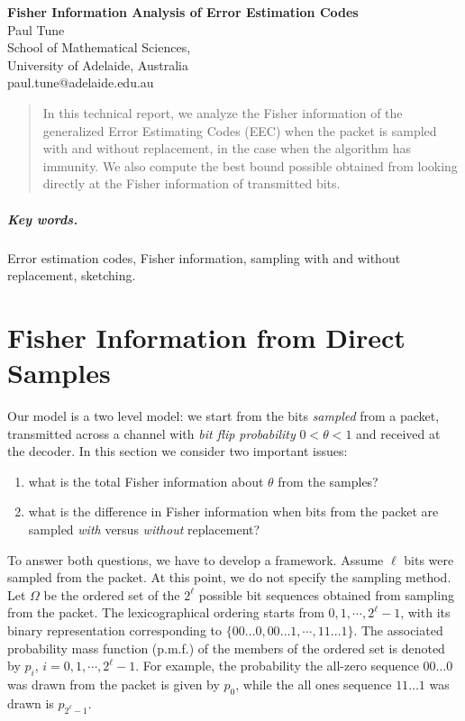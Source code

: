 \documentclass[12pt]{article}
\numberwithin{equation}{section}
\numberwithin{table}{section}
\numberwithin{figure}{section}
\begin{document}

\begin{center}
\textbf{\Large Fisher Information Analysis of Error Estimation Codes} \\[6pt]
  Paul Tune \\[6pt]
  School of Mathematical Sciences,\\
  University of Adelaide, Australia  \\[6pt]
  paul.tune@adelaide.edu.au
\end{center}

\begin{abstract}
In this technical report, we analyze the Fisher information of the generalized Error Estimating Codes (EEC) when the packet is sampled with 
and without replacement, in the case when the algorithm has immunity. We also compute the best bound possible obtained from looking 
directly at the Fisher information of transmitted bits.
\end{abstract}

\subparagraph{Key words.} Error estimation codes, Fisher information, sampling with and without replacement,
sketching.



\section{Fisher Information from Direct Samples}

Our model is a two level model: we start from the bits \textit{sampled} from a packet, transmitted across a channel with \textit{bit flip probability} 
$0 < \theta < 1$ and received at the decoder. In this section we consider two important issues:
\begin{enumerate}
\item what is the total Fisher information about $\theta$ from the samples?
\item what is the difference in Fisher information when bits from the packet are sampled \textit{with} versus \textit{without} replacement?
\end{enumerate}

To answer both questions, we have to develop a framework. Assume $\ell$ bits were sampled from the packet. At this point, we do not specify
the sampling method. Let $\Omega$ be the ordered set of the $2^\ell$ possible bit sequences obtained from sampling from the packet. The
lexicographical ordering starts from $0,1,\cdots,2^{\ell}-1$, with its binary representation corresponding to $\{00\ldots0, 00\ldots1,\cdots,
11\ldots1\}$. The associated probability mass function (p.m.f.) of the members of the ordered set is denoted by $p_i$, $i = 0,1,\cdots,
2^{\ell}-1$. For example, the probability the all-zero sequence $00\ldots0$ was drawn from the packet is given by $p_0$, while the all ones 
sequence $11\ldots1$ was drawn is $p_{2^\ell-1}$.
\end{document}
